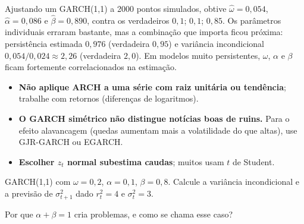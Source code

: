 \begin{simulacao}
Ajustando um GARCH(1,1) a 2000 pontos simulados, obtive $\hat\omega=0{,}054$, $\hat\alpha=0{,}086$ e $\hat\beta=0{,}890$, contra os verdadeiros $0{,}1$; $0{,}1$; $0{,}85$. Os parâmetros individuais erraram bastante, mas a combinação que importa ficou próxima: persistência estimada $0{,}976$ (verdadeira $0{,}95$) e variância incondicional $0{,}054/0{,}024\approx2{,}26$ (verdadeira $2{,}0$). Em modelos muito persistentes, $\omega$, $\alpha$ e $\beta$ ficam fortemente correlacionados na estimação.
\end{simulacao}

\begin{atencao}
\begin{itemize}[leftmargin=1.2em]
\item \textbf{Não aplique ARCH a uma série com raiz unitária ou tendência}; trabalhe com retornos (diferenças de logaritmos).
\item \textbf{O GARCH simétrico não distingue notícias boas de ruins.} Para o efeito alavancagem (quedas aumentam mais a volatilidade do que altas), use GJR-GARCH ou EGARCH.
\item \textbf{Escolher $z_t$ normal subestima caudas}; muitos usam $t$ de Student.
\end{itemize}
\end{atencao}

\begin{exercicio}
GARCH(1,1) com $\omega=0{,}2$, $\alpha=0{,}1$, $\beta=0{,}8$. Calcule a variância incondicional e a previsão de $\sigma^2_{t+1}$ dado $r_t^2=4$ e $\sigma_t^2=3$.
\end{exercicio}

\begin{exercicio}
Por que $\alpha+\beta=1$ cria problemas, e como se chama esse caso?
\end{exercicio}
